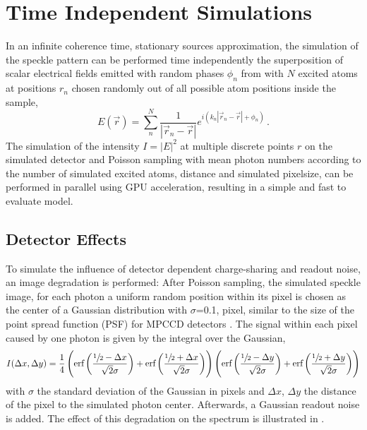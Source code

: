 \section{Time Independent Simulations}
In an infinite coherence time, stationary sources approximation, the simulation of the speckle pattern can be performed time independently the superposition of scalar electrical fields emitted with random phases $\phi_n$ from with $N$ excited atoms  at positions $r_n$ chosen randomly out of all possible atom positions inside the sample,
\begin{equation}
E(\vec{r})=\sum_n^N \frac{1}{\left|\vec{r}_n-\vec{r}\right|} e^{i(k_n{\left|\vec{r}_n-\vec{r}\right|}+\phi_n)} \,.
\end{equation} 
The simulation of the intensity $I=\left|E\right|^2$ at multiple discrete points $r$ on the simulated detector and Poisson sampling with mean photon numbers according to the number of simulated excited atoms, distance  and simulated pixelsize, can be performed in parallel using GPU acceleration, resulting in a simple and fast to evaluate model. 




\subsection{Detector Effects}
\label{sec:chargesharing}
To simulate the influence of detector dependent charge-sharing and readout noise, an image degradation is performed: After Poisson sampling, the simulated speckle image, for each photon a uniform random position within its pixel is chosen as the center of a Gaussian distribution with $\sigma$=0.1, pixel, similar to the size of the point spread function (PSF) for MPCCD detectors \cite{mpccd}.
The signal within each pixel caused by one photon is given by the integral over the Gaussian,
\begin{equation*}
	I(\Delta x,\Delta y)=\frac{1}{4} \left(\text{erf}\left(\frac{\sfrac{1}{2}-\Delta x}{\sqrt{2}
		\sigma}\right)+\text{erf}\left(\frac{\sfrac{1}{2}+\Delta x}{\sqrt{2} \sigma}\right)\right) \left(\text{erf}\left(\frac{\sfrac{1}{2}-\Delta y}{\sqrt{2}
		\sigma}\right)+\text{erf}\left(\frac{\sfrac{1}{2}+\Delta y}{\sqrt{2} \sigma}\right)\right)
\end{equation*}
with $\sigma$ the standard deviation of the Gaussian in pixels and $\Delta x$, $\Delta y$ the distance of the pixel to the simulated photon center. Afterwards, a Gaussian readout noise is added. The effect of this degradation on the spectrum is illustrated in .

